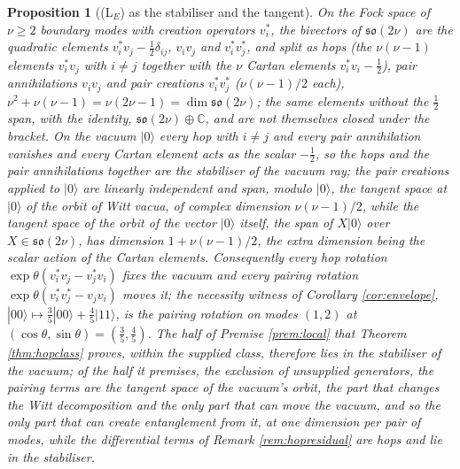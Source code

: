 \documentclass[11pt]{article}
\newtheorem{proposition}[theorem]{Proposition}
\theoremstyle{definition}
\newcommand{\C}{\mathbb{C}}
\begin{document}
\begin{proposition}[(L$_E$) as the stabiliser and the tangent]\label{prop:stabtangent}
On the Fock space of $\nu \geq 2$ boundary modes with creation operators $v^*_i$, the bivectors of $\mathfrak{so}(2\nu)$ are the quadratic elements $v^*_i v_j - \tfrac12\delta_{ij}$, $v_i v_j$ and $v^*_i v^*_j$, and split as hops (the $\nu(\nu - 1)$ elements $v^*_i v_j$ with $i \neq j$ together with the $\nu$ Cartan elements $v^*_i v_i - \tfrac12$), pair annihilations $v_i v_j$ and pair creations $v^*_i v^*_j$ ($\nu(\nu - 1)/2$ each), $\nu^2 + \nu(\nu - 1) = \nu(2\nu - 1) = \dim\mathfrak{so}(2\nu)$; the same elements without the $\tfrac12$ span, with the identity, $\mathfrak{so}(2\nu) \oplus \C$, and are not themselves closed under the bracket. On the vacuum $|0\rangle$ every hop with $i \neq j$ and every pair annihilation vanishes and every Cartan element acts as the scalar $-\tfrac12$, so the hops and the pair annihilations together are the stabiliser of the vacuum ray; the pair creations applied to $|0\rangle$ are linearly independent and span, modulo $|0\rangle$, the tangent space at $|0\rangle$ of the orbit of Witt vacua, of complex dimension $\nu(\nu - 1)/2$, while the tangent space of the orbit of the vector $|0\rangle$ itself, the span of $X|0\rangle$ over $X \in \mathfrak{so}(2\nu)$, has dimension $1 + \nu(\nu - 1)/2$, the extra dimension being the scalar action of the Cartan elements. Consequently every hop rotation $\exp\theta(v^*_i v_j - v^*_j v_i)$ fixes the vacuum and every pairing rotation $\exp\theta(v^*_i v^*_j - v_j v_i)$ moves it; the necessity witness of Corollary \ref{cor:envelope}, $|00\rangle \mapsto \tfrac35|00\rangle + \tfrac45|11\rangle$, is the pairing rotation on modes $(1,2)$ at $(\cos\theta, \sin\theta) = (\tfrac35, \tfrac45)$. The half of Premise \ref{prem:local} that Theorem \ref{thm:hopclass} proves, within the supplied class, therefore lies in the stabiliser of the vacuum; of the half it premises, the exclusion of unsupplied generators, the pairing terms are the tangent space of the vacuum's orbit, the part that changes the Witt decomposition and the only part that can move the vacuum, and so the only part that can create entanglement from it, at one dimension per pair of modes, while the differential terms of Remark \ref{rem:hopresidual} are hops and lie in the stabiliser.
\end{proposition}
\end{document}
